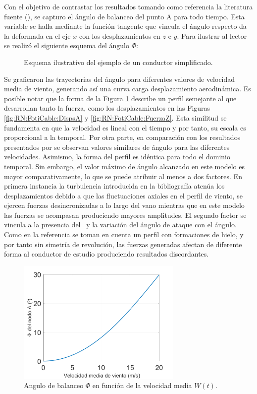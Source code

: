 Con el objetivo de contrastar los resultados tomando como referencia la literatura fuente (\textcite{foti2018finite}), se capturo el ángulo de balanceo del punto $\text{A}$ para todo tiempo. Esta variable se halla mediante la función tangente que vincula el ángulo respecto da la deformada en el eje $x$ con los desplazamientos en $z$ e $y$. Para ilustrar al lector se realizó el siguiente esquema del ángulo $\Phi$:

\begin{figure}[htbp]
	\centering
	\def\svgwidth{80mm}
	
	\caption{Esquema ilustrativo del ejemplo de un conductor simplificado.}
	\label{fig:RN:FotiCable:Angulo}
\end{figure}


Se graficaron las trayectorias del ángulo para diferentes valores de velocidad media de viento, generando así una curva carga desplazamiento aerodinámica. Es posible notar que la forma de la Figura \ref{fig:RN:FotiCable:Angulo} describe un perfil semejante al que desarrollan tanto la fuerza, como los desplazamientos en las Figuras \ref{fig:RN:FotiCable:DispsA} y \ref{fig:RN:FotiCable:FuerzaZ}. Esta similitud se fundamenta en que la velocidad es lineal con el tiempo y por tanto, su escala es proporcional a la temporal.
Por otra parte, en comparación con los resultados presentados por \cite{foti2018finite} se observan valores similares de ángulo para las diferentes velocidades. Asimismo, la forma del perfil es idéntica para todo el dominio temporal. Sin embargo, el valor máximo de ángulo alcanzado en este modelo es mayor comparativamente, lo que se puede atribuir al menos a dos factores. En primera instancia la turbulencia introducida en la bibliografía atenúa los desplazamientos debido a que las fluctuaciones axiales en el perfil de viento, se ejercen fuerzas desincronizadas a lo largo del vano mientras que en este modelo las fuerzas se acompasan produciendo mayores amplitudes. El segundo factor se vincula a la presencia del \ y la variación del ángulo de ataque con el ángulo. Como en la referencia \cite{foti2018finite} se toman en cuenta un perfil con formaciones de hielo, y por tanto sin simetría de revolución, las fuerzas generadas afectan de diferente forma al conductor de estudio produciendo resultados discordantes. 


\begin{figure}[htbp]
	\centering
	\includegraphics[width=80mm]{./imagenes/ResultadosNumericos/SimpleCable/Angulo_Foti.png}
	\caption{Angulo de balanceo $\Phi$ en función de la velocidad media $W(t)$.}
	\label{fig:CableAngulo}
\end{figure}

